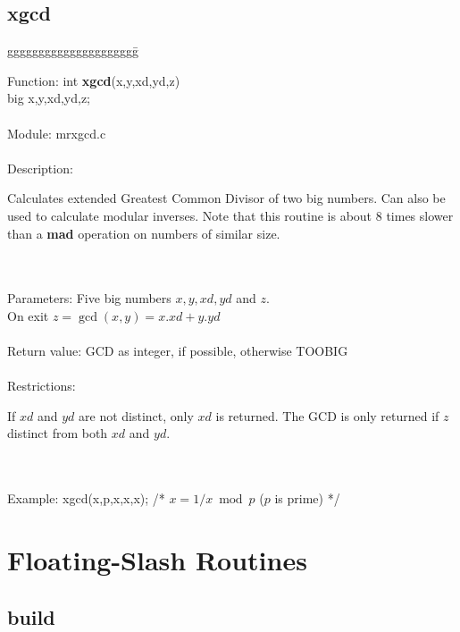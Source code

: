 \subsection{xgcd}

\begin{tabbing}
ggggggggggggggggggggg\= \kill

      Function:      \>int {\bf xgcd}(x,y,xd,yd,z) \\
                     \>big x,y,xd,yd,z; \\
      \ \\
      Module:        \>mrxgcd.c \\
      \ \\
      Description:   \>
                     \parbox[t]{3in}
                     {Calculates extended Greatest Common Divisor of two big
                     numbers. Can also be used to calculate modular inverses.
                     Note that this routine is about 8 times slower than a 
                     {\bf mad} operation on numbers of similar size.} \\
      \ \\
      Parameters:    \>Five big numbers $x,y,xd,yd$ and $z$. \\
                     \>On exit $z=\gcd(x,y)=x.xd+y.yd$  \\
      \ \\
      Return value:  \>GCD as integer, if possible, otherwise TOOBIG  \\
      \ \\
      Restrictions:  \>
                     \parbox[t]{3in}
                     {If $xd$ and $yd$ are not distinct, only $xd$ is 
                      returned. The GCD is only returned if $z$ distinct from 
                      both $xd$ and $yd$.} \\
      \ \\
      Example:       \>xgcd(x,p,x,x,x);  /* $x = 1/x \bmod p $ ($p$ is prime) */  
\end{tabbing}


\pagebreak
\section{Floating-Slash Routines}

\subsection{build}

